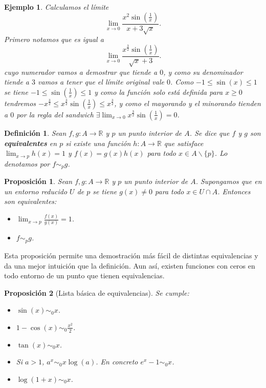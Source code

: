\documentclass{article}
\newtheorem{prop}{Proposición}
\newtheorem{define}{Definición}
\newtheorem{ejem}{Ejemplo}
\newcommand{\reales}{\mathbb{R}}
\begin{document}
\begin{ejem}
	Calculamos el límite
	\begin{equation*}
		\lim_{x\rightarrow 0} \frac{x^2 \sin(\frac{1}{x})}{x + 3\sqrt{x}}.
	\end{equation*}
	Primero notamos que es igual a 
	\begin{equation*}
		\lim_{x\rightarrow 0} \frac{x^{\frac{3}{2}} \sin(\frac{1}{x})}{\sqrt{x} + 3}.
	\end{equation*}
	cuyo numerador vamos a demostrar que tiende a $0$, y como su denominador tiende a $3$ vamos a tener que el límite original vale $0$.
	Como $-1 \leq \sin(x) \leq 1$ se tiene $-1 \leq \sin(\frac{1}{x}) \leq 1$ y como la función solo está definida para $x \geq 0$ tendremos $-x^{\frac{3}{2}} \leq x^{\frac{3}{2}}\sin(\frac{1}{x}) \leq x^{\frac{3}{2}}$, y como el mayorando y el minorando tienden a $0$ por la regla del sandwich $\exists \lim_{x\rightarrow 0}x^{\frac{3}{2}}\sin(\frac{1}{x}) = 0$.
\end{ejem}

\begin{define}
	Sean $f,g: A \rightarrow \reales$ y $p$ un punto interior de $A$. Se dice que $f$ y $g$ son \textbf{equivalentes} en $p$ si existe una función $h:A \rightarrow \reales$ que satisface $\lim_{x \rightarrow p} h(x) = 1$ y $f(x) = g(x)h(x)$ para todo $x \in A \smallsetminus \{p \}$. Lo denotamos por $f \sim_p g$.
\end{define}

\begin{prop}
	Sean $f,g: A \rightarrow \reales$ y $p$ un punto interior de $A$. Supongamos que en un entorno reducido $U$ de $p$ se tiene $g(x) \neq 0$ para todo $x \in U \cap A$. Entonces son equivalentes:
	\begin{itemize}
		\item
		$\lim_{x\rightarrow p} \frac{f(x)}{g(x)} = 1$.
		\item
		$f \sim_p g$.
	\end{itemize}
\end{prop}

Esta proposición permite una demostración más fácil de distintas equivalencias y da una mejor intuición que la definición. Aun así, existen funciones con ceros en todo entorno de un punto que tienen equivalencias.

\begin{prop}[Lista básica de equivalencias]
	Se cumple:
	\begin{itemize}
		\item
		$\sin(x) \sim_0 x$.
		
		\item
		$1 - \cos(x) \sim_0 \frac{x^2}{2}$.
		
		\item
		$\tan(x) \sim_0 x$.		
		
		\item
		Si $a > 1$, $a^x \sim_0 x\log(a)$. En concreto $e^x - 1 \sim_0 x$.

		\item
		$\log(1 + x) \sim_0 x$.		
		
	\end{itemize}
\end{prop}
\end{document}
